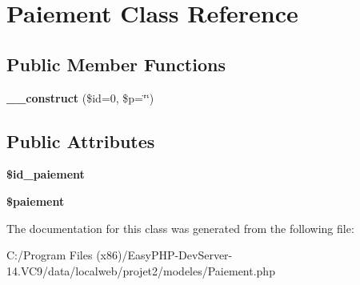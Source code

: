 \hypertarget{class_paiement}{}\section{Paiement Class Reference}
\label{class_paiement}
\subsection*{Public Member Functions}
\begin{DoxyCompactItemize}
\item 
\mbox{\label{class_paiement_abbad9640c171ee0a7ccba97d9c7a568f}} 
{\bfseries \+\_\+\+\_\+construct} (\$id=0, \$p=\char`\"{}\char`\"{})
\end{DoxyCompactItemize}
\subsection*{Public Attributes}
\begin{DoxyCompactItemize}
\item 
\mbox{\label{class_paiement_ac785d37e68b5eb12d0e4faca56e8766b}} 
{\bfseries \$id\+\_\+paiement}
\item 
\mbox{\label{class_paiement_a344f35b63e5c7c506d1751b98884b567}} 
{\bfseries \$paiement}
\end{DoxyCompactItemize}


The documentation for this class was generated from the following file\+:\begin{DoxyCompactItemize}
\item 
C\+:/\+Program Files (x86)/\+Easy\+P\+H\+P-\/\+Dev\+Server-\/14.\+V\+C9/data/localweb/projet2/modeles/Paiement.\+php\end{DoxyCompactItemize}
